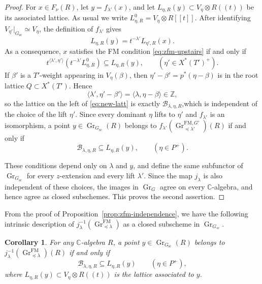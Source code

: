 \documentclass[a4paper, 12pt]{amsart}
\newtheorem{corollary}[theorem]{Corollary}
\theoremstyle{definition}
\newcommand{\C}{\mathbb C}
\DeclareMathOperator{\Gr}{\mathrm{Gr}}
\begin{document}
\begin{proof}
For $x\in F_\nu(R)$, let $y=f_{\lambda'}(x)$, and let
$L_{\eta,R}(y)\subset V_\eta\otimes R((t))$ be its associated lattice.
As usual we write $L^0_{\eta,R}=V_\eta\otimes R[[t]]$. After identifying
$V_{\eta'}|_{G_{\mathrm{sc}}}\simeq V_\eta$, the definition of
$f_{\lambda'}$ gives
\begin{equation}\label{eq:zfm-translated-lattice}
L_{\eta,R}(y)
=
t^{-\lambda'}L_{\eta',R}(x).
\end{equation}
As a consequence, $x$ satisfies the FM condition \eqref{eq:zfm-upstairs}
if and only if
\begin{equation}\label{eq:new-latt}
t^{\langle\lambda',\eta'\rangle}
(t^{-\lambda'}L^0_{\eta,R})
\subseteq L_{\eta,R}(y),
\qquad(\eta'\in X^*(T')^+).
\end{equation}
If $\beta'$ is a  $T'$-weight appearing in $V_{\eta}(\beta)$, then
$\eta'-\beta'=p^*(\eta-\beta)$ is in the root lattice $Q\subset X^*(T')$. Hence
\[
\langle\lambda',\eta'-\beta'\rangle
=\langle\lambda,\eta-\beta\rangle\in \mathbb{Z},
\]
so the lattice on the left of \eqref{eq:new-latt} is exactly $\mathcal B_{\lambda,\eta,R}$,which is
independent of the choice of the lift $\eta'$. Since every dominant $\eta$ lifts to $\eta'$
and $f_{\lambda'}$ is an isomorphism, a point
$y\in\Gr_{G_{\mathrm{sc}}}(R)$ belongs to
$f_{\lambda'}(\Gr^{\mathrm{FM},G'}_{\preceq\lambda'})(R)$ if and only if
\begin{equation}\label{eq:zfm-intrinsic-test}
\mathcal B_{\lambda,\eta,R}
\subseteq L_{\eta,R}(y),
\qquad(\eta\in P^+).
\end{equation}

These conditions depend only on $\lambda$ and $y$, and define the same
subfunctor of $\Gr_{G_{\mathrm{sc}}}$ for every $z$-extension and every
lift $\lambda'$. Since the map $j_\lambda$ is also independent of these
choices, the images in $\Gr_G$ agree on every $\C$-algebra, and hence
agree as closed subschemes. This proves the second assertion.
\end{proof}



From the proof of Proposition~\ref{prop:zfm-independence}, we have the following intrinsic description of $j_\lambda^{-1}( \Gr^{\mathrm{FM}}_{\preceq\lambda})$ as a closed subscheme in $\Gr_{G_{sc}}$.
\begin{corollary}\label{cor:fm-intrinsic}
For any $\C$-algebra $R$, a point $y\in\Gr_{G_{\mathrm{sc}}}(R)$
belongs to $j_\lambda^{-1}(\Gr^{\mathrm{FM}}_{\preceq\lambda})(R)$
if and only if
\[
\mathcal B_{\lambda,\eta,R}\subseteq L_{\eta,R}(y)
\qquad(\eta\in P^+),
\]
where $L_{\eta,R}(y)\subset V_\eta\otimes R((t))$ is the lattice associated to $y$.
\end{corollary}
\end{document}
